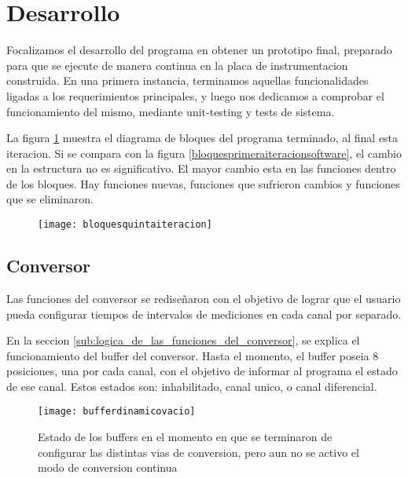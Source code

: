 
\section{Desarrollo} %
\label{it5:sec:desarrollo}

Focalizamos el desarrollo del programa en obtener un prototipo final, preparado para que se ejecute de manera continua en la placa de instrumentacion construida. En una primera instancia, terminamos aquellas funcionalidades ligadas a los requerimientos principales, y luego nos dedicamos a comprobar el funcionamiento del mismo, mediante unit-testing y tests de sistema.

La figura \ref{it5:fig:bloquesquintaiteracion} muestra el diagrama de bloques del programa terminado, al final esta iteracion. Si se compara con la figura \ref{bloquesprimeraiteracionsoftware}, el cambio en la estructura no es significativo. El mayor cambio esta en las funciones dentro de los bloques. Hay funciones nuevas, funciones que sufrieron cambios y funciones que se eliminaron.

\begin{figure}[h]
  \centering
  \texttt{[image: bloquesquintaiteracion]}
  \caption{}\label{it5:fig:bloquesquintaiteracion}
\end{figure}

\subsection{Conversor} %
\label{sub:conversor}

Las funciones del conversor se rediseñaron con el objetivo de lograr que el usuario pueda configurar tiempos de intervalos de mediciones en cada canal por separado.

En la seccion \ref{sub:logica_de_las_funciones_del_conversor}, se explica el funcionamiento del buffer del conversor. Hasta el momento, el buffer poseia 8 posiciones, una por cada canal, con el objetivo de informar al programa el estado de ese canal. Estos estados son: inhabilitado, canal unico, o canal diferencial.

\begin{figure}[h]
  \centering
  \texttt{[image: bufferdinamicovacio]}
  \caption{Estado de los buffers en el momento en que se terminaron de configurar las distintas vias de conversion, pero aun no se activo el modo de conversion continua}\label{it5:fig:bufferdinamicovacio}
\end{figure}

